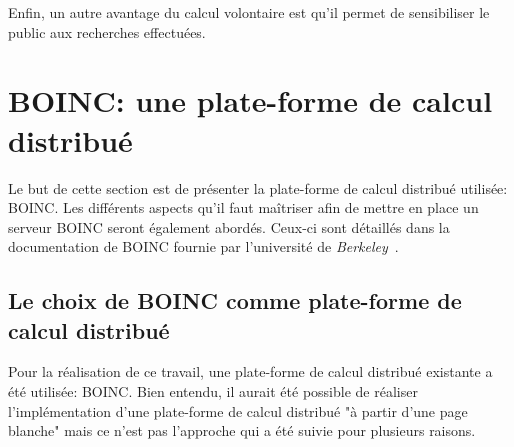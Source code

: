 \documentclass[a4paper, 12pt]{report}
\begin{document}
Enfin, un autre avantage du calcul volontaire est qu'il permet de sensibiliser le public aux recherches effectuées.

\section{\textsc{BOINC}: une plate-forme de calcul distribué}
\label{boincpresentation}
Le but de cette section est de présenter la plate-forme de calcul distribué utilisée: \textsc{BOINC}. Les différents aspects qu'il faut maîtriser afin de mettre en place un serveur \textsc{BOINC} seront également abordés. Ceux-ci sont détaillés dans la documentation de \textsc{BOINC} fournie par l'université de \textit{Berkeley}~\cite{WIKI}.

\subsection{Le choix de \textsc{BOINC} comme plate-forme de calcul distribué}
\label{avantagesboinc}
Pour la réalisation de ce travail, une plate-forme de calcul distribué existante a été utilisée: \textsc{BOINC}. Bien entendu, il aurait été possible de réaliser l'implémentation d'une plate-forme de calcul distribué "à partir d'une page blanche" mais ce n'est pas l'approche qui a été suivie pour plusieurs raisons.
\end{document}
